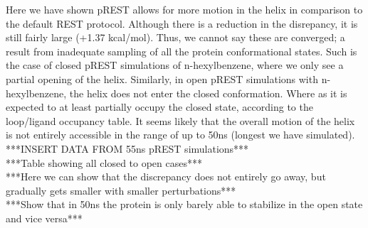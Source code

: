 \documentclass{article}
\begin{document}
Here we have shown pREST allows for more motion in the helix in comparison to the default REST protocol.
Although there is a reduction in the disrepancy, it is still fairly large (+1.37 kcal/mol).
Thus, we cannot say these are converged; a result from inadequate sampling of all the protein conformational states. %
Such is the case of closed pREST simulations of n-hexylbenzene, where we only see a partial opening of the helix.
Similarly, in open pREST simulations with n-hexylbenzene, the helix does not enter the closed conformation.
Where as it is expected to at least partially occupy the closed state, according to the loop/ligand occupancy table.
It seems likely that the overall motion of the helix is not entirely accessible in the range of up to 50ns (longest we have simulated).\\

***INSERT DATA FROM 55ns pREST simulations***\\ %
***Table showing all closed to open cases***\\
***Here we can show that the discrepancy does not entirely go away, but gradually gets smaller with smaller perturbations***\\
***Show that in 50ns the protein is only barely able to stabilize in the open state and vice versa***\\
\end{document}

